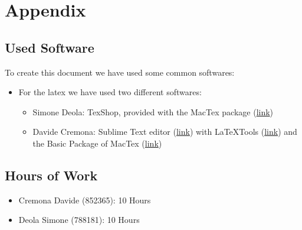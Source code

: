 \documentclass[../../projectPlan.tex]{subfiles}
\begin{document}
	\chapter{Appendix}
	
		\section{Used Software}
		To create this document we have used some common softwares:
		\begin{itemize}
			\item For the latex we have used two different softwares:
			\begin{itemize}
			
				\item Simone Deola: TexShop, provided with the MacTex package (\href{https://tug.org/mactex/}{link})
			
				\item Davide Cremona: Sublime Text editor (\href{http://www.sublimetext.com}{link}) with LaTeXTools (\href{https://github.com/SublimeText/LaTeXTools}{link}) and the Basic Package of MacTex (\href{https://tug.org/mactex/}{link})

			\end{itemize}

		\end{itemize}
		
		\section{Hours of Work}
		\begin{itemize}
			\item Cremona Davide (852365): 10 Hours
			\item Deola Simone (788181): 10 Hours
		\end{itemize}
\end{document}
